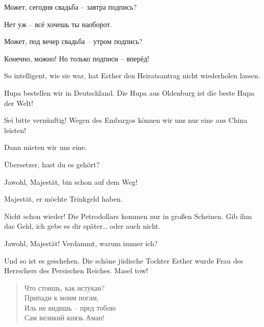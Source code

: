 \documentclass[12pt,a4paper,titlepage]{article}
\begin{document}
\begin{drama}
Может, сегодня свадьба -- завтра подпись?

Нет уж -- всё хочешь ты наоборот.

Может, под вечер свадьба -- утром подпись­­?

Конечно, можно! Но только подписи -- вперёд!

\vspace{3ex}

\uespeaks
So intelligent, wie sie war, hat Esther den Heiratsantrag nicht wiederholen lassen.

\vspace{3ex}

\espeaks {}
Hupa bestellen wir in Deutschland. Die Hupa aus Oldenburg ist die beste Hupa der Welt!

\ahspeaks
Sei bitte vernünftig! Wegen des Embargos können wir uns nur eine aus China leisten!

\espeaks
Dann mieten wir uns eine.

\ahspeaks
Übersetzer, hast du es gehört?

\uespeaks
Jawohl, Majestät, bin schon auf dem Weg!

\scene


\uespeaks
Majestät, er möchte Trinkgeld haben.

\ahspeaks
{} Nicht schon wieder!  Die Petrodollars kommen nur in großen Scheinen. Gib ihm das Geld, ich gebe es dir später\ldots
{} oder auch nicht.

\uespeaks
Jawohl, Majestät!  Verdammt, warum immer ich?



\uespeaks
Und so ist es geschehen. Die schöne jüdische Tochter Esther
wurde Frau des Herrschers des Persischen Reiches. Masel tow!


\scene


\amspeaks {}
\begin{verse}
Что стоишь, как истукан?\\
Припади к моим ногам,\\
Иль не видишь -- пред тобою\\
Сам великий князь Аман!\\
\end{verse}


\end{drama}
\end{document}
